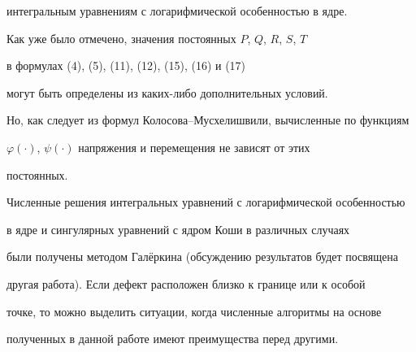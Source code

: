 интегральным уравнениям с логарифмической особенностью в ядре.





Как уже было отмечено, значения постоянных $P$, $Q$, $R$, $S$, $T$


в формулах (4), (5), (11), (12), (15), (16) и (17)


могут быть определены из каких-либо дополнительных условий.


Но, как следует из формул Колосова--Мусхелишвили, вычисленные по функциям


$\varphi(\cdot)$, $\psi(\cdot)$ напряжения и перемещения не зависят от этих


постоянных.





Численные решения интегральных уравнений с логарифмической особенностью


в ядре и сингулярных уравнений с ядром Коши в различных случаях


были получены методом Гал\"еркина (обсуждению результатов будет посвящена


другая работа). Если дефект расположен близко к границе или к особой


точке, то можно выделить ситуации, когда численные алгоритмы на основе


полученных в данной работе имеют преимущества перед другими.





